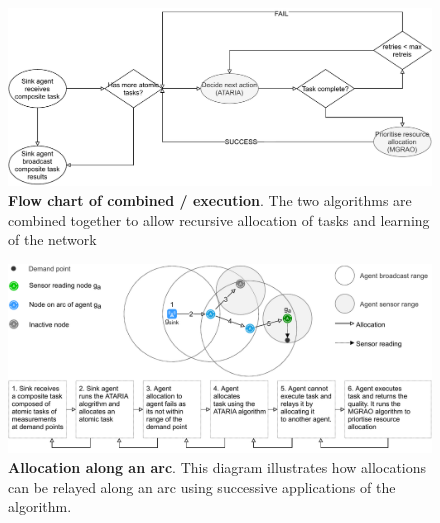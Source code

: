 \begin{figure}
	\centering
	\includegraphics[width=0.9\linewidth]{algorithm-flow}
	\caption{\textbf{Flow chart of combined \acronymATARIA{}{}/\acronymMGRAO{}{} execution}. The two algorithms are combined together to allow recursive allocation of tasks and learning of the network}
	\label{fig:algorithm-flow}
\end{figure}
\begin{figure}
	\centering
	\includegraphics[width=0.9\linewidth]{arc-flow}
	\caption{\textbf{Allocation along an arc}. This diagram illustrates how allocations can be relayed along an arc using successive applications of the \acronymATARIA{}{} algorithm.}
	\label{fig:arc-flow}
\end{figure}